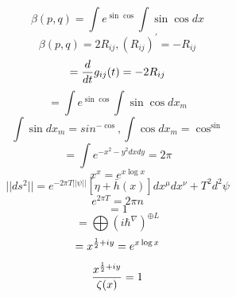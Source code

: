 \documentclass{jsarticle}
\begin{document}
\title{}
\author{}
\date{}
\maketitle

  $$ \beta(p,q) = \int e^{\sin \cos}\int \sin \cos dx $$
  $$ \beta(p,q) = 2 R_{ij}, (R_{ij})^{'} = - R_{ij} $$
  $$  = {d \over dt}g_{ij}(t) = - 2 R_{ij} $$
  $$ = \int e^{\sin \cos}\int \sin \cos dx_m $$
  $$ \int \sin dx_m = sin^{-\cos }, \int \cos dx_m = \cos^{\sin} $$
  $$ = \int e^{-x^2 - y^2 dxdy} = 2 \pi $$
  $$ x^x = e^{x \log x} $$
  $$ ||ds^2|| = e^{-2 \pi T||\psi||}[\eta + \bar{h}(x)]dx^{\mu}dx^{\nu}
  + T^2 d^2 \psi $$
  $$ e^{2\pi T} = 2 \pi n $$
  $$ = 1 $$
  $$ = \bigoplus{(i \hbar^{\nabla})}^{\oplus L}$$
  $$ = x^{{1 \over 2} + iy} = e^{x \log x} $$
  $$ {{x^{{1 \over 2} + iy}} \over {\zeta(x)}} = 1 $$
\end{document}
